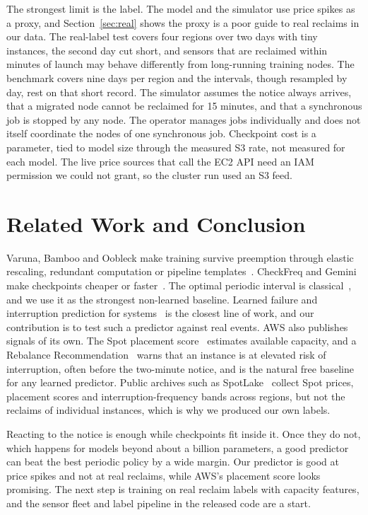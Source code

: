 \documentclass{article}
\begin{document}
The strongest limit is the label. The model and the simulator use price spikes as a proxy, and Section~\ref{sec:real} shows the proxy is a poor guide to real reclaims in our data. The real-label test covers four regions over two days with tiny instances, the second day cut short, and sensors that are reclaimed within minutes of launch may behave differently from long-running training nodes. The benchmark covers nine days per region and the intervals, though resampled by day, rest on that short record. The simulator assumes the notice always arrives, that a migrated node cannot be reclaimed for 15 minutes, and that a synchronous job is stopped by any node. The operator manages jobs individually and does not itself coordinate the nodes of one synchronous job. Checkpoint cost is a parameter, tied to model size through the measured S3 rate, not measured for each model. The live price sources that call the EC2 API need an IAM permission we could not grant, so the cluster run used an S3 feed.

\section{Related Work and Conclusion}
\label{sec:related}

Varuna, Bamboo and Oobleck make training survive preemption through elastic rescaling, redundant computation or pipeline templates~\citep{varuna, bamboo, oobleck}. CheckFreq and Gemini make checkpoints cheaper or faster~\citep{checkfreq, gemini}. The optimal periodic interval is classical~\citep{young1974, daly2006}, and we use it as the strongest non-learned baseline. Learned failure and interruption prediction for systems~\citep{node-failure-pred} is the closest line of work, and our contribution is to test such a predictor against real events. AWS also publishes signals of its own. The Spot placement score~\citep{aws-placement} estimates available capacity, and a Rebalance Recommendation~\citep{aws-rebalance} warns that an instance is at elevated risk of interruption, often before the two-minute notice, and is the natural free baseline for any learned predictor. Public archives such as SpotLake~\citep{spotlake} collect Spot prices, placement scores and interruption-frequency bands across regions, but not the reclaims of individual instances, which is why we produced our own labels.

Reacting to the notice is enough while checkpoints fit inside it. Once they do not, which happens for models beyond about a billion parameters, a good predictor can beat the best periodic policy by a wide margin. Our predictor is good at price spikes and not at real reclaims, while AWS's placement score looks promising. The next step is training on real reclaim labels with capacity features, and the sensor fleet and label pipeline in the released code are a start.
\end{document}
